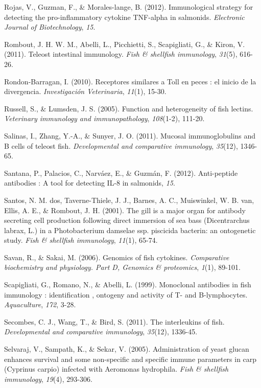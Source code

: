 \documentclass[12pt,letterpaper,oneside]{scrbook}
\begin{document}
Rojas, V., Guzman, F., \& Morales-lange, B. (2012). Immunological
strategy for detecting the pro-inflammatory cytokine TNF-alpha in
salmonids. \emph{Electronic Journal of Biotechnology}, \emph{15}.

Rombout, J. H. W. M., Abelli, L., Picchietti, S., Scapigliati, G., \&
Kiron, V. (2011). Teleost intestinal immunology. \emph{Fish \& shellfish
immunology}, \emph{31}(5), 616-26.

Rondon-Barragan, I. (2010). Receptores similares a Toll en peces : el
inicio de la divergencia. \emph{Investigación Veterinaria},
\emph{11}(1), 15-30.

Russell, S., \& Lumsden, J. S. (2005). Function and heterogeneity of
fish lectins. \emph{Veterinary immunology and immunopathology},
\emph{108}(1-2), 111-20.

Salinas, I., Zhang, Y.-A., \& Sunyer, J. O. (2011). Mucosal
immunoglobulins and B cells of teleost fish. \emph{Developmental and
comparative immunology}, \emph{35}(12), 1346-65.

Santana, P., Palacios, C., Narváez, E., \& Guzmán, F. (2012).
Anti-peptide antibodies : A tool for detecting IL-8 in salmonids,
\emph{15}.

Santos, N. M. dos, Taverne-Thiele, J. J., Barnes, A. C., Muiswinkel, W.
B. van, Ellis, A. E., \& Rombout, J. H. (2001). The gill is a major
organ for antibody secreting cell production following direct immersion
of sea bass (Dicentrarchus labrax, L.) in a Photobacterium damselae ssp.
piscicida bacterin: an ontogenetic study. \emph{Fish \& shellfish
immunology}, \emph{11}(1), 65-74.

Savan, R., \& Sakai, M. (2006). Genomics of fish cytokines.
\emph{Comparative biochemistry and physiology. Part D, Genomics \&
proteomics}, \emph{1}(1), 89-101.

Scapigliati, G., Romano, N., \& Abelli, L. (1999). Monoclonal antibodies
in fish immunology : identification , ontogeny and activity of T- and
B-lymphocytes. \emph{Aquaculture}, \emph{172}, 3-28.

Secombes, C. J., Wang, T., \& Bird, S. (2011). The interleukins of fish.
\emph{Developmental and comparative immunology}, \emph{35}(12), 1336-45.

Selvaraj, V., Sampath, K., \& Sekar, V. (2005). Administration of yeast
glucan enhances survival and some non-specific and specific immune
parameters in carp (Cyprinus carpio) infected with Aeromonas hydrophila.
\emph{Fish \& shellfish immunology}, \emph{19}(4), 293-306.
\end{document}
